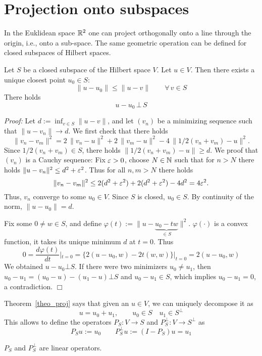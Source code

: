 \section{Projection onto subspaces}

In the Euklidean space ${\mathbb R}^2$ one can project orthogonally onto a
line through the origin, i.e., onto a sub-space. The same geometric
operation can be defined for closed subspaces of Hilbert spaces.

\begin{theorem} \label{theo_proj}
Let $S$ be a closed subspace of the Hilbert space $V$. 
Let $u \in V$. Then there exists a unique closest point $u_0 \in S$:
$$
\| u - u_0 \| \leq \| u - v \| \qquad \forall \, v \in S
$$
There holds
$$
u - u_0 \, \bot \, S
$$
\end{theorem}
\noindent
{\em Proof:} Let $d := \inf_{v \in S} \| u - v\|$, and let $(v_n)$ be
a minimizing sequence such that $\| u - v_n \| \rightarrow d$. 
We first check that there holds
$$
\| v_n - v_m \|^2 = 2 \, \| v_n - u \|^2 + 2 \, \| v_m - u \|^2 - 4 \,  \| 1/2(v_n+v_m) - u \|^2.
$$
Since $1/2 (v_n+v_m) \in S$, there holds $\| 1/2 (v_n+v_m) - u \| \geq d$.
We proof that $(v_n)$ is a Cauchy sequence:
Fix $\varepsilon > 0$, choose $N \in {\mathbb N}$ such that for $n > N$ there holds
$\| u - v_n \|^2 \leq d^2 + \varepsilon^2$. Thus for all $n,m > N$ there holds
$$
\| v_n - v_m \|^2 \leq 2 (d^2+\varepsilon^2) + 2 (d^2 + \varepsilon^2) - 4 d^2 = 4 \varepsilon^2.
$$ 
Thus, $v_n$ converge to some $u_0 \in V$. Since $S$ is closed, $u_0 \in S$.
By continuity of the norm, $\| u - u_0 \| = d$.

\medskip
Fix some $0 \neq w \in S$, and define $\varphi(t) := \| u - \underbrace{u_0 - t w}_{\in S} \|^2$.
$\varphi(\cdot)$ is a convex function, it takes its unique minimum $d$ at $t=0$. Thus
$$
0 = \frac{d \varphi(t)}{dt}|_{t=0} = \{ 2 (u-u_0, w) - 2 t (w,w) \} |_{t=0} = 
   2 (u-u_0,w)
$$ 
We obtained $u-u_0 \bot S$. If there were two minimizers $u_0 \neq u_1$, 
then $u_0-u_1 = (u_0-u) - (u_1-u) \bot S$ and $u_0-u_1 \in S$, which implies
$u_0-u_1 = 0$, a contradiction.
\hfill $\Box$

\bigskip
Theorem~\ref{theo_proj} says that given an $u \in V$, we can uniquely
decompose it as
$$
u = u_0 + u_1, \qquad u_0 \in S \quad u_1 \in S^\bot
$$
This allows to define the operators $P_S : V \rightarrow S$ and $P_S^\bot : V \rightarrow S^\bot$ as 
$$
P_S u := u_0 \qquad P_S^\bot u := (I - P_S) u = u_1
$$

\begin{theorem} $P_S$ and $P_S^\bot$ are linear operators. 
\end{theorem}


